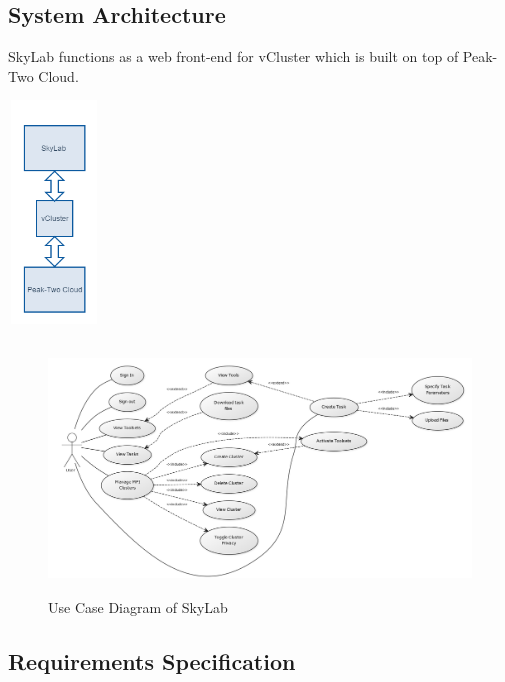 \documentclass[journal]{./IEEE/IEEEtran}
\begin{document}
    \subsection{System Architecture}
    SkyLab functions as a web front-end for vCluster which is built on top of Peak-Two Cloud.
   	\begin{center}			
		\includegraphics[width=92px,height=224px]{./images/system_architecture.png}			
	\end{center}	
    



	
    \begin{figure}[ht]
      \centering
      \includegraphics[width=500px,height=250px]{./images/use_case_large.png}
      \caption{Use Case Diagram of SkyLab}\label{System Architecture}
    \end{figure}

    \subsection{Requirements Specification}
\end{document}
